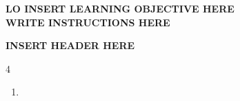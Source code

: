 \documentclass[17pt,a4paper,landscape]{extarticle}
\begin{document}
\sffamily
\boldmath

{\LARGE \textbf{LO INSERT LEARNING OBJECTIVE HERE}}\\[0.35em]
{\large \textbf{WRITE INSTRUCTIONS HERE}}

\vspace{2.6em}
{\LARGE \textbf{INSERT HEADER HERE}}
\begin{multicols}{4}
\begin{enumerate}[
  itemsep=7.6em,
  label=\textbf{\arabic*.}, 
  labelwidth=2.2em,
  labelsep=0.75em,
  leftmargin=!,
  align=left
]
\item 
\end{enumerate}
\end{multicols}
\end{document}
